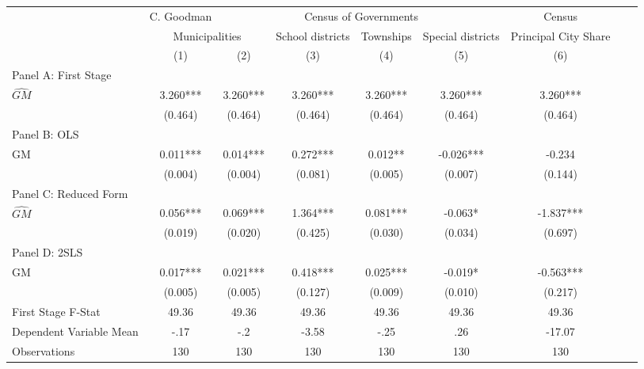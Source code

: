  \begin{tabular}{l*{8}{c}} \toprule
&\multicolumn{1}{c}{C. Goodman}&\multicolumn{4}{c}{Census of Governments}&\multicolumn{1}{c}{Census}\\\cmidrule(lr){2-2}\cmidrule(lr){3-6}\cmidrule(lr){7-7}
&\multicolumn{2}{c}{Municipalities}&\multicolumn{1}{c}{School districts}&\multicolumn{1}{c}{Townships}&\multicolumn{1}{c}{Special districts}&\multicolumn{1}{c}{Principal City Share}\\\cmidrule(lr){2-3}\cmidrule(lr){4-6}\cmidrule(lr){7-7}
&\multicolumn{1}{c}{(1)}&\multicolumn{1}{c}{(2)}&\multicolumn{1}{c}{(3)}&\multicolumn{1}{c}{(4)}&\multicolumn{1}{c}{(5)}&\multicolumn{1}{c}{(6)}\\
\cmidrule(lr){1-7}
\multicolumn{6}{l}{Panel A: First Stage}\\
\cmidrule(lr){1-7}
$\widehat{GM}$  &    3.260***&    3.260***&    3.260***&    3.260***&    3.260***&    3.260***\\
                &  (0.464)   &  (0.464)   &  (0.464)   &  (0.464)   &  (0.464)   &  (0.464)   \\
\cmidrule(lr){1-7}
\multicolumn{6}{l}{Panel B: OLS}\\
\cmidrule(lr){1-7}
GM              &    0.011***&    0.014***&    0.272***&    0.012** &   -0.026***&   -0.234   \\
                &  (0.004)   &  (0.004)   &  (0.081)   &  (0.005)   &  (0.007)   &  (0.144)   \\
\cmidrule(lr){1-7}
\multicolumn{6}{l}{Panel C: Reduced Form}\\
\cmidrule(lr){1-7}
$\widehat{GM}$  &    0.056***&    0.069***&    1.364***&    0.081***&   -0.063*  &   -1.837***\\
                &  (0.019)   &  (0.020)   &  (0.425)   &  (0.030)   &  (0.034)   &  (0.697)   \\
\cmidrule(lr){1-7}
\multicolumn{6}{l}{Panel D: 2SLS}\\
\cmidrule(lr){1-7}
GM              &    0.017***&    0.021***&    0.418***&    0.025***&   -0.019*  &   -0.563***\\
                &  (0.005)   &  (0.005)   &  (0.127)   &  (0.009)   &  (0.010)   &  (0.217)   \\
\midrule
First Stage F-Stat&    49.36   &    49.36   &    49.36   &    49.36   &    49.36   &    49.36   \\
Dependent Variable Mean&     -.17   &      -.2   &    -3.58   &     -.25   &      .26   &   -17.07   \\
Observations    &      130   &      130   &      130   &      130   &      130   &      130   \\
       \bottomrule \end{tabular}
